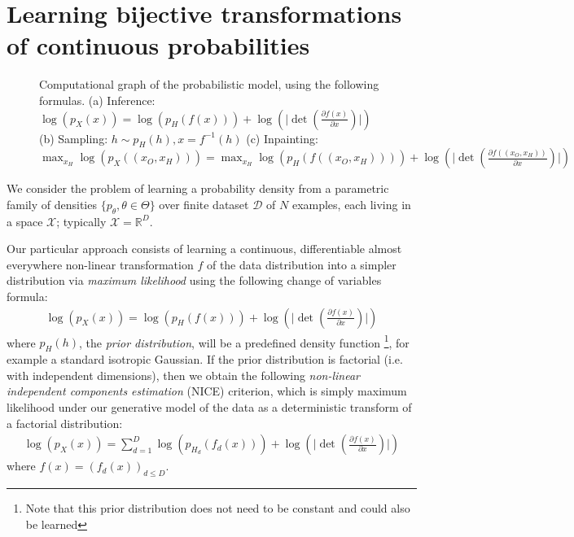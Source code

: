 \documentclass{article}
\newcommand {\RR} {\mathbb R}
\def\D{{\mathcal{D}}}
\def\X{{\mathcal{X}}}
\begin{document}
\section{Learning bijective transformations of continuous probabilities} 
\begin{figure}
    \centering {}
    \caption{Computational graph of the probabilistic model, using the following formulas.\newline
    (a) Inference: $\log(p_X(x)) = \log(p_H(f(x))) + \log(\lvert \det(\frac{\partial f(x)}{\partial x}) \rvert)$\newline
    (b) Sampling: $h \sim p_H(h), x = f^{-1}(h)$\newline
    (c) Inpainting: $\max_{x_H} \log(p_X((x_{O},x_{H}))) = \max_{x_H} \log(p_H(f((x_{O}, x_{H})))) + \log(\lvert \det(\frac{\partial f((x_{O}, x_{H}))}{\partial x}) \rvert)$\newline
    }
\end{figure}



We consider the problem of learning a probability density from a parametric family of
densities $\{p_{\theta}, \theta \in \Theta \}$ over finite dataset $\D$ of $N$
examples, each living in a space $\X$; typically $\X = \RR^{D}$.




Our particular approach consists of learning a continuous, differentiable
almost everywhere non-linear transformation $f$ of the data distribution
into a simpler distribution via {\em maximum likelihood}
using the following change of variables formula:
\begin{align*}
\log(p_X(x)) = \log(p_H(f(x))) +
\log(\lvert \det(\frac{\partial f(x)}{\partial x}) \rvert)
\end{align*}
where $p_H(h)$, the \textit{prior distribution},
will be a predefined density function
\footnote{Note that this prior distribution
does not need to be constant and could also be learned}, 
for example a
standard isotropic Gaussian.
If the prior distribution is factorial (i.e. with independent dimensions), then we obtain the following
\textit{non-linear independent components estimation} (NICE) criterion, which is simply maximum likelihood under our generative model of the data as a deterministic transform of a factorial distribution:
\begin{align*}
\log(p_X(x)) = \sum_{d=1}^{D}{\log(p_{H_{d}}(f_{d}(x)))} + \log(\lvert \det(\frac{\partial f(x)}{\partial x}) \rvert)
\end{align*}
where $f(x) = (f_{d}(x))_{d \leq D}$.
\end{document}
